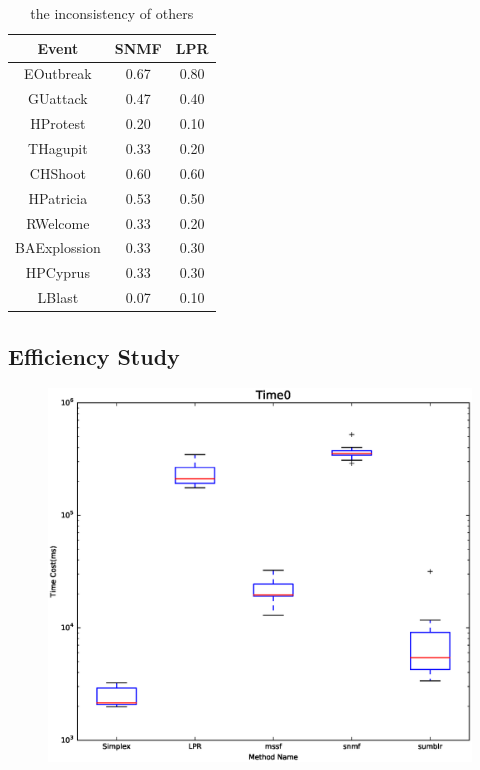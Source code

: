 \documentclass{llncs}
\begin{document}
\begin{table}[htp]\label{table:inconsistency 0f others}
\caption{the inconsistency of others}
\begin{center}
\begin{tabular}{|c|c|c|}
    \hline
    Event & SNMF & LPR \\
    \hline
    EOutbreak & 0.67 & 0.80 \\
    \hline
    GUattack & 0.47 & 0.40 \\
    \hline
    HProtest & 0.20 & 0.10 \\
    \hline
    THagupit & 0.33 & 0.20\\
    \hline
    CHShoot & 0.60 & 0.60\\
    \hline
    HPatricia & 0.53 & 0.50\\
    \hline
    RWelcome & 0.33 & 0.20\\
    \hline
    BAExplossion & 0.33 & 0.30\\
    \hline
    HPCyprus & 0.33 & 0.30\\
    \hline
    LBlast & 0.07 & 0.10\\
    \hline
\end{tabular}
\end{center}
\label{default}
\end{table}

\subsection{Efficiency Study}



\begin{figure}
    \centering
    \includegraphics[scale=0.5]{log_time0.eps}

    \label{fig:side:a}
\end{figure}
\end{document}
